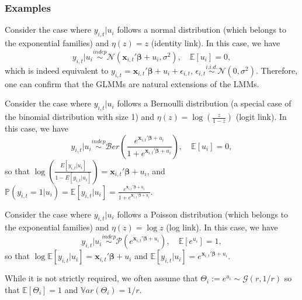 \documentclass[ignorenonframetext,]{beamer}
\begin{document}
\begin{frame}[allowframebreaks]
\frametitle{Examples}

\begin{example}
Consider the case where $y_{i,t}|u_i$ follows a normal distribution (which belongs to the exponential families) and $\eta(z)=z$ (identity link). In this case, we have
$$
y_{i,t}|u_i \overset{indep}\sim \mathcal{N}(\mathbf{x}_{i,t}'\bm{\beta} + u_i, \sigma^2), \quad \mathbb{E}[u_i]=0,
$$
which is indeed equivalent to $y_{i,t} = \mathbf{x}_{i,t}'\bm{\beta} + u_i + \epsilon_{i,t}$, $\epsilon_{i,t} \overset{i.i.d.}\sim \mathcal{N}(0, \sigma^2)$. Therefore, one can confirm that the GLMMs are natural extensions of the LMMs.
\end{example}

\framebreak

\begin{example}
Consider the case where $y_{i,t}|u_i$ follows a Bernoulli distribution (a special case of the binomial distribution with size 1) and $\eta(z)=\log\left(\frac{z}{1-z}\right)$ (logit link). In this case, we have
$$
y_{i,t}|u_i \overset{indep}\sim \mathcal{B}er\left( \frac{e^{\mathbf{x}_{i,t}'\bm{\beta} + u_i}}{1+e^{\mathbf{x}_{i,t}'\bm{\beta} + u_i}}\right), \quad \mathbb{E}[u_i]=0,
$$
so that $\log\left(\frac{E[y_{i,t}|u_i]}{1-E[y_{i,t}|u_i]}\right) = \mathbf{x}_{i,t}'\bm{\beta} + u_i$, and $\mathbb{P}(y_{i,t}=1|u_i) = \mathbb{E}[y_{i,t}|u_i] = \frac{e^{\mathbf{x}_{i,t}'\bm{\beta} + u_i}}{1+e^{\mathbf{x}_{i,t}'\bm{\beta} + u_i}}$.
\end{example}

\framebreak

\begin{example}
Consider the case where $y_{i,t}|u_i$ follows a Poisson distribution (which belongs to the exponential families) and $\eta(z)=\log z$ (log link). In this case, we have
$$
y_{i,t}|u_i \overset{indep}\sim \mathcal{P}(e^{\mathbf{x}_{i,t}'\bm{\beta} + u_i}), \quad \mathbb{E}[e^{u_i}]=1,
$$
so that $\log \mathbb{E}[y_{i,t}|u_i] = \mathbf{x}_{i,t}'\bm{\beta} + u_i$ and $\mathbb{E}[y_{i,t}|u_i] = e^{\mathbf{x}_{i,t}'\bm{\beta} + u_i}$.

While it is not strictly required, we often assume that $\Theta_i := e^{u_i} \sim \mathcal{G}(r, 1/r)$ so that $\mathbb{E}[\Theta_i]=1$ and $\mathbb{V}ar(\Theta_i) = 1/r$.
\end{example}


\end{frame}
\end{document}
